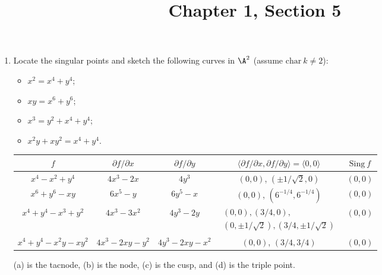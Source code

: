 \documentclass[a4paper]{article}
\title{Chapter 1, Section 5}
\begin{document}
\maketitle

\begin{enumerate} [label=\textbf{\arabic*.}, leftmargin=0cm]

    \item[\textbf{1.}] Locate the singular points and sketch the following curves in $\A^2$ (assume $\text{char}~k \neq 2$):
          \begin{itemize}
              \item[(a)] $x^2 = x^4 + y^4$;
              \item[(b)] $xy = x^6 + y^6$;
              \item[(c)] $x^3 = y^2 + x^4 + y^4$;
              \item[(d)] $x^2y + xy^2 = x^4 + y^4$.
          \end{itemize}

          \begin{center}
              \renewcommand{\arraystretch}{1.4}
              \begin{tabular}{c|c|c|c|c}
                  $f$                        & $\partial f / \partial x$ & $\partial f / \partial y$ & $\langle \partial f / \partial x, \partial f / \partial y\rangle = \langle 0, 0\rangle$ & $\text{Sing}~f$ \\ \hline
                  $x^4 - x^2 + y^4$          & $4x^3 - 2x$               & $4y^3$                    & $(0, 0)$, $(\pm 1/\sqrt{2}, 0)$                                                         & $(0, 0)$        \\ \hline
                  $x^6 + y^6 - xy$           & $6x^5 - y$                & $6y^5 - x$                & $(0, 0)$, $(6^{-1/4}, 6^{-1/4})$                                                        & $(0, 0)$        \\ \hline
                  $x^4 + y^4 - x^3 + y^2$    & $4x^3 - 3x^2$             & $4y^3 - 2y$               & $\substack{(0, 0), (3/4, 0), \\ (0, \pm 1 / \sqrt{2}), (3/4, \pm 1 / \sqrt{2})}$        & $(0, 0)$        \\ \hline
                  $x^4 + y^4 - x^2 y - xy^2$ & $4x^3 - 2xy - y^2$        & $4y^3 - 2xy - x^2$        & $(0, 0)$, $(3/4, 3/4)$                                                                  & $(0, 0)$
              \end{tabular}
          \end{center}
          (a) is the tacnode, (b) is the node, (c) is the cusp, and (d) is the triple point.


\end{enumerate}
\end{document}
